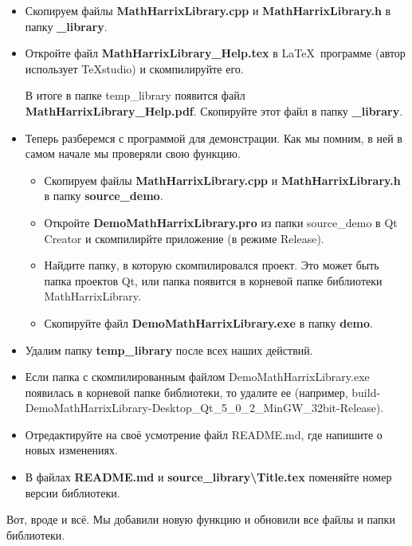 \begin{itemize}
\item Скопируем файлы \textbf{MathHarrixLibrary.cpp} и \textbf{MathHarrixLibrary.h} в папку \textbf{\_library}.

\item Откройте файл \textbf{MathHarrixLibrary\_Help.tex } в \LaTeX \ программе (автор использует TeXstudio) и скомпилируйте его.

В итоге в папке temp\_library появится файл \textbf{MathHarrixLibrary\_Help.pdf}. Скопируйте этот файл в папку \textbf{\_library}.

\item Теперь разберемся с программой для демонстрации. Как мы помним, в ней в самом начале мы проверяли свою функцию. 
\begin{itemize}
\item Скопируем файлы \textbf{MathHarrixLibrary.cpp} и \textbf{MathHarrixLibrary.h} в папку \textbf{source\_demo}.
\item  Откройте \textbf{DemoMathHarrixLibrary.pro} из папки source\_demo в Qt Creator и скомпилирйте приложение (в режиме Release).
\item Найдите папку, в которую скомпилировался проект. Это может быть папка проектов Qt, или папка появится в корневой папке библиотеки MathHarrixLibrary.
\item Скопируйте файл \textbf{DemoMathHarrixLibrary.exe} в папку \textbf{demo}.
\end{itemize}
\item Удалим папку \textbf{temp\_library} после всех наших действий.
\item  Если папка с скомпилированным файлом DemoMathHarrixLibrary.exe появилась в корневой папке библиотеки, то удалите ее (например, build-DemoMathHarrixLibrary-Desktop\_Qt\_5\_0\_2\_MinGW\_32bit-Release).
\item Отредактируйте на своё усмотрение файл README.md, где напишите о новых изменениях.
\item В файлах \textbf{README.md} и \textbf{source\_library\textbackslash Title.tex} поменяйте номер версии библиотеки.
\end{itemize}

Вот, вроде и всё. Мы добавили новую функцию и обновили все файлы и папки библиотеки.